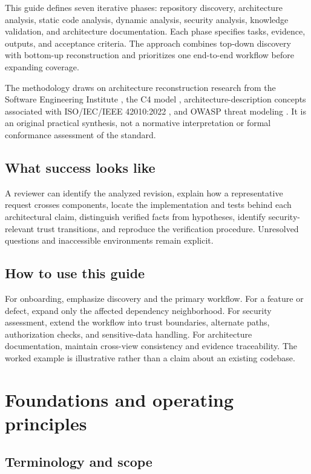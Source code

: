 \documentclass[11pt,letterpaper]{article}
\begin{document}
This guide defines seven iterative phases: repository discovery, architecture analysis, static code analysis, dynamic analysis, security analysis, knowledge validation, and architecture documentation. Each phase specifies tasks, evidence, outputs, and acceptance criteria. The approach combines top-down discovery with bottom-up reconstruction and prioritizes one end-to-end workflow before expanding coverage.

The methodology draws on architecture reconstruction research from the Software Engineering Institute \cite{sei}, the C4 model \cite{c4}, architecture-description concepts associated with ISO/IEC/IEEE 42010:2022 \cite{iso}, and OWASP threat modeling \cite{owasp}. It is an original practical synthesis, not a normative interpretation or formal conformance assessment of the standard.

\subsection*{What success looks like}
A reviewer can identify the analyzed revision, explain how a representative request crosses components, locate the implementation and tests behind each architectural claim, distinguish verified facts from hypotheses, identify security-relevant trust transitions, and reproduce the verification procedure. Unresolved questions and inaccessible environments remain explicit.

\subsection*{How to use this guide}
For onboarding, emphasize discovery and the primary workflow. For a feature or defect, expand only the affected dependency neighborhood. For security assessment, extend the workflow into trust boundaries, alternate paths, authorization checks, and sensitive-data handling. For architecture documentation, maintain cross-view consistency and evidence traceability. The worked example is illustrative rather than a claim about an existing codebase.
\clearpage
\begingroup
\small
\setlength{\parskip}{0pt}
\tableofcontents
\endgroup
\clearpage
{}
\section{Foundations and operating principles}
\subsection{Terminology and scope}
\end{document}
